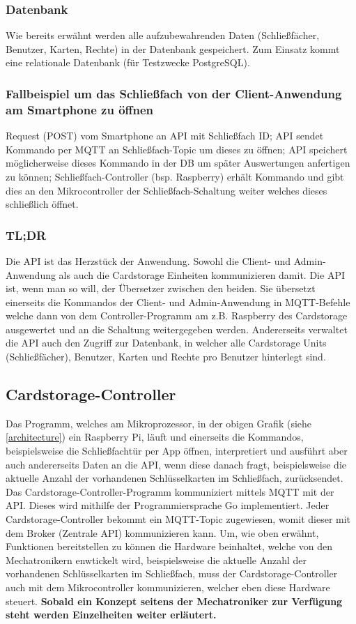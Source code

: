 \documentclass[a4paper]{article}
\begin{document}
\subsubsection{Datenbank}
Wie bereits erwähnt werden alle aufzubewahrenden Daten (Schließfächer, Benutzer, Karten, Rechte) in der Datenbank gespeichert. Zum Einsatz kommt eine relationale Datenbank (für Testzwecke PostgreSQL).

\subsubsection{Fallbeispiel um das Schließfach von der Client-Anwendung am Smartphone zu öffnen}
Request (POST) vom Smartphone an API mit Schließfach ID; API sendet Kommando per MQTT an Schließfach-Topic um dieses zu öffnen; API speichert möglicherweise dieses Kommando in der DB um später Auswertungen anfertigen zu können; Schließfach-Controller (bsp. Raspberry) erhält Kommando und gibt dies an den Mikrocontroller der Schließfach-Schaltung weiter welches dieses schließlich öffnet.   

\subsubsection{TL;DR}
Die API ist das Herzstück der Anwendung. Sowohl die Client- und Admin-Anwendung als auch die Cardstorage Einheiten kommunizieren damit. Die API ist, wenn man so will, der Übersetzer zwischen den beiden. Sie übersetzt einerseits die Kommandos der Client- und Admin-Anwendung in MQTT-Befehle welche dann von dem Controller-Programm am z.B. Raspberry des Cardstorage ausgewertet und an die Schaltung weitergegeben werden. Andererseits verwaltet die API auch den Zugriff zur Datenbank, in welcher alle Cardstorage Units (Schließfächer), Benutzer, Karten und Rechte pro Benutzer hinterlegt sind. 

\newpage

\subsection{Cardstorage-Controller}
Das Programm, welches am Mikroprozessor, in der obigen Grafik (siehe \autoref{architecture}) ein Raspberry Pi, läuft und einerseits die Kommandos, beispielsweise die Schließfachtür per App öffnen, interpretiert und ausführt aber auch andererseits Daten an die API, wenn diese danach fragt, beispielsweise die aktuelle Anzahl der vorhandenen Schlüsselkarten im Schließfach, zurücksendet. Das Cardstorage-Controller-Programm kommuniziert mittels MQTT mit der API. Dieses wird mithilfe der Programmiersprache Go implementiert. Jeder Cardstorage-Controller bekommt ein MQTT-Topic zugewiesen, womit dieser mit dem Broker (Zentrale API) kommunizieren kann. Um, wie oben erwähnt, Funktionen bereitstellen zu können die Hardware beinhaltet, welche von den Mechatronikern enwtickelt wird, beispielsweise die aktuelle Anzahl der vorhandenen Schlüsselkarten im Schließfach, muss der Cardstorage-Controller auch mit dem Mikrocontroller kommunizieren, welcher eben diese Hardware steuert. \textbf{Sobald ein Konzept seitens der Mechatroniker zur Verfügung steht werden Einzelheiten weiter erläutert.}
\end{document}
